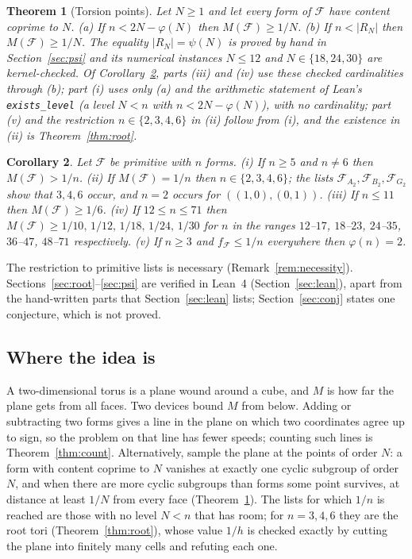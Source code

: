 \documentclass[11pt]{amsart}
\newtheorem{theorem}{Theorem}
\newtheorem{corollary}[theorem]{Corollary}
\theoremstyle{definition}
\theoremstyle{remark}
\newcommand{\lean}[1]{\texttt{#1}}
\begin{document}
\begin{theorem}[Torsion points]\label{thm:psi}
Let $N\ge1$ and let every form of $\mathcal F$ have content coprime to $N$. (a) If $n<2N-\varphi(N)$ then $M(\mathcal F)\ge 1/N$. (b) If $n<|R_N|$ then $M(\mathcal F)\ge 1/N$. The equality $|R_N|=\psi(N)$ is proved by hand in Section~\ref{sec:psi} and its numerical instances $N\le12$ and $N\in\{18,24,30\}$ are kernel-checked. Of Corollary~\ref{cor:prim}, parts (iii) and (iv) use these checked cardinalities through (b); part (i) uses only (a) and the arithmetic statement of Lean's \lean{exists\_level} (a level $N<n$ with $n<2N-\varphi(N)$), with no cardinality; part (v) and the restriction $n\in\{2,3,4,6\}$ in (ii) follow from (i), and the existence in (ii) is Theorem~\ref{thm:root}.
\end{theorem}

\begin{corollary}\label{cor:prim}
Let $\mathcal F$ be primitive with $n$ forms. (i) If $n\ge5$ and $n\ne6$ then $M(\mathcal F)>1/n$. (ii) If $M(\mathcal F)=1/n$ then $n\in\{2,3,4,6\}$; the lists $\mathcal F_{A_2},\mathcal F_{B_2},\mathcal F_{G_2}$ show that $3,4,6$ occur, and $n=2$ occurs for $((1,0),(0,1))$. (iii) If $n\le11$ then $M(\mathcal F)\ge1/6$. (iv) If $12\le n\le71$ then $M(\mathcal F)\ge 1/10,\,1/12,\,1/18,\,1/24,\,1/30$ for $n$ in the ranges $12$--$17$, $18$--$23$, $24$--$35$, $36$--$47$, $48$--$71$ respectively. (v) If $n\ge3$ and $f_{\mathcal F}\le1/n$ everywhere then $\varphi(n)=2$.
\end{corollary}

The restriction to primitive lists is necessary (Remark~\ref{rem:necessity}). Sections~\ref{sec:root}--\ref{sec:psi} are verified in Lean~4 (Section~\ref{sec:lean}), apart from the hand-written parts that Section~\ref{sec:lean} lists; Section~\ref{sec:conj} states one conjecture, which is not proved.

\subsection{Where the idea is}
A two-dimensional torus is a plane wound around a cube, and $M$ is how far the plane gets from all faces. Two devices bound $M$ from below. Adding or subtracting two forms gives a line in the plane on which two coordinates agree up to sign, so the problem on that line has fewer speeds; counting such lines is Theorem~\ref{thm:count}. Alternatively, sample the plane at the points of order $N$: a form with content coprime to $N$ vanishes at exactly one cyclic subgroup of order $N$, and when there are more cyclic subgroups than forms some point survives, at distance at least $1/N$ from every face (Theorem~\ref{thm:psi}). The lists for which $1/n$ is reached are those with no level $N<n$ that has room; for $n=3,4,6$ they are the root tori (Theorem~\ref{thm:root}), whose value $1/h$ is checked exactly by cutting the plane into finitely many cells and refuting each one.
\end{document}

